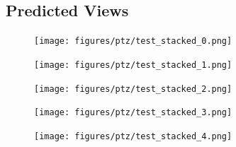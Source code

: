 \begin{appendices}
\section{Predicted Views}
\begin{figure}[H]
    \centering
    \texttt{[image: figures/ptz/test\_stacked\_0.png]}
\end{figure}
\begin{figure}[H]
    \centering
    \texttt{[image: figures/ptz/test\_stacked\_1.png]}
\end{figure}
\begin{figure}[H]
    \centering
    \texttt{[image: figures/ptz/test\_stacked\_2.png]}
\end{figure}
\begin{figure}[H]
    \centering
    \texttt{[image: figures/ptz/test\_stacked\_3.png]}
\end{figure}
\begin{figure}[H]
    \centering
    \texttt{[image: figures/ptz/test\_stacked\_4.png]}
\end{figure}

\end{appendices}